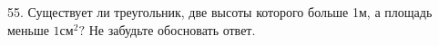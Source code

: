 55. Существует ли треугольник, две высоты которого больше 1м, а площадь меньше $1\text{см}^2?$ Не забудьте обосновать ответ.\\
